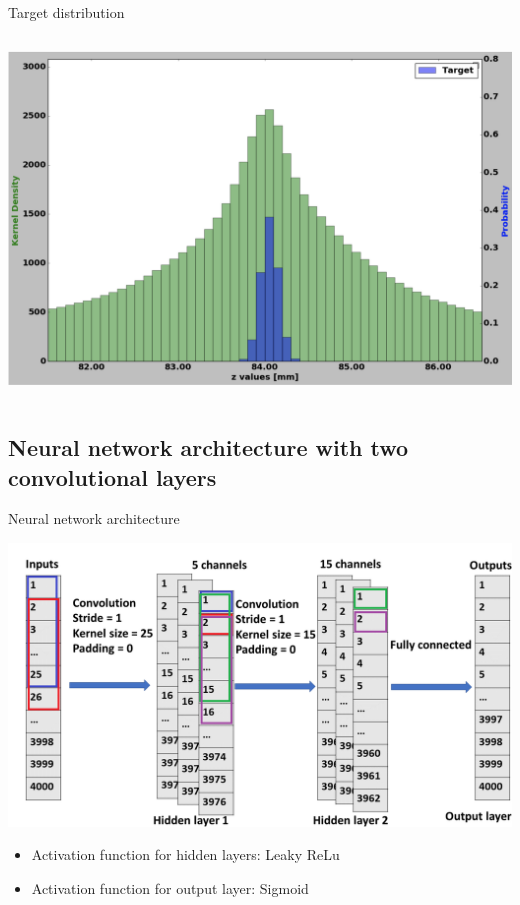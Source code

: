 \begin{frame}{Target distribution}
\begin{columns}[c]
\begin{center}
    \includegraphics[width=1\textwidth,height=0.45\textwidth, trim=18 0 18 0]{images/T_2_25.png}
  \end{center}
  \end{columns}
\end{frame}
\subsection{Neural network architecture with two convolutional layers}
\begin{frame}{Neural network architecture}
    \begin{center}
      \includegraphics[width=0.75\linewidth, trim=0 30 0 0]{images/CNN_2.png}
   \end{center}
   \begin{itemize}
       \item Activation function for hidden layers: Leaky ReLu
       \item Activation function for output layer: Sigmoid
   \end{itemize}
\end{frame}
